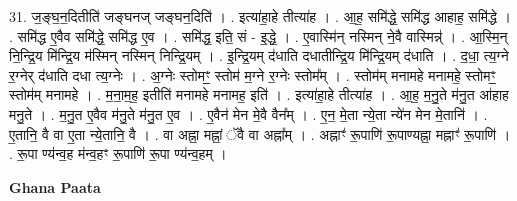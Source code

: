 \documentclass[17pt]{extarticle}
\begin{document}
31. ज॒ङ्घ॒न॒दितीति॑ जङ्घनज् जङ्घन॒दिति॑ । . इत्या॑हा॒हे तीत्या॑ह । . आ॒ह॒ समि॑द्धे॒ समि॑द्ध आहाह॒ समि॑द्धे । . समि॑द्ध ए॒वैव समि॑द्धे॒ समि॑द्ध ए॒व । . समि॑द्ध॒ इति॒ सं - इ॒द्धे॒ । . ए॒वास्मि॑न् नस्मिन् ने॒वै वास्मिन्न्॑ । . आ॒स्मि॒न् नि॒न्द्रि॒य मि॑न्द्रि॒य म॑स्मिन् नस्मिन् निन्द्रि॒यम् । . इ॒न्द्रि॒यम् द॑धाति दधातीन्द्रि॒य मि॑न्द्रि॒यम् द॑धाति । . द॒धा॒ त्य॒ग्ने र॒ग्नेर् द॑धाति दधा त्य॒ग्नेः । . अ॒ग्नेः स्तोमꣳ॒॒ स्तोम॑ म॒ग्ने र॒ग्नेः स्तोम᳚म् । . स्तोम॑म् मनामहे मनामहे॒ स्तोमꣳ॒॒ स्तोम॑म् मनामहे । . म॒ना॒म॒ह॒ इतीति॑ मनामहे मनामह॒ इति॑ । . इत्या॑हा॒हे तीत्या॑ह । . आ॒ह॒ म॒नु॒ते म॑नु॒त आ॑हाह मनु॒ते । . म॒नु॒त ए॒वैव म॑नु॒ते म॑नु॒त ए॒व । . ए॒वैन॑ मेन मे॒वै वैन᳚म् । . ए॒न॒ मे॒ता न्ये॒ता न्ये॑न मेन मे॒तानि॑ । . ए॒तानि॒ वै वा ए॒ता न्ये॒तानि॒ वै । . वा अह्ना॒ मह्नां॒ ॅवै वा अह्ना᳚म् । . अह्नाꣳ॑ रू॒पाणि॑ रू॒पाण्यह्ना॒ मह्नाꣳ॑ रू॒पाणि॑ । . रू॒पा ण्य॑न्व॒ह म॑न्व॒हꣳ रू॒पाणि॑ रू॒पा ण्य॑न्व॒हम् । \newline

\textbf{Ghana Paata } \newline
\end{document}
